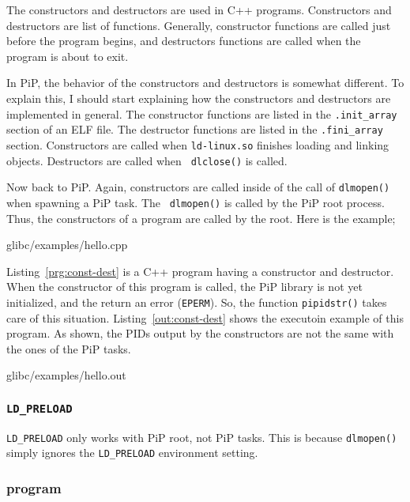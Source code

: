 The constructors and destructors are used in C++
programs. Constructors and destructors are list of
functions. Generally, constructor functions are called just before the 
program begins, and destructors functions are called when the program
is about to exit.

In PiP, the behavior of the constructors and destructors is
somewhat different. To explain this, I should start explaining how the
constructors and destructors are implemented in general. The
constructor functions are listed in the {\tt .init_array} section of an ELF
file. The destructor functions are listed in the {\tt .fini_array}
section. Constructors are called when {\tt ld-linux.so} finishes
loading and linking objects. Destructors are called when {\tt
  dlclose()} is called.

Now back to PiP. Again, constructors are called inside
of the call of {\tt dlmopen()} when spawning a PiP task. The {\tt
  dlmopen()} is called by the PiP root process. Thus, the constructors
of a program are called by the root. Here is the example;

 {glibc/examples/hello.cpp}

Listing~\ref{prg:const-dest} is a C++ program having a constructor and
destructor. When the constructor of this program is called, the PiP
library is not yet initialized, and the 
return an error ({\tt EPERM}). So, the function {\tt pipidstr()} takes
care of this situation. Listing~\ref{out:const-dest} shows the
executoin example of this program. As shown, the PIDs output by the
constructors are not the same with the ones of the PiP tasks. 

 {glibc/examples/hello.out}

\subsubsection{{\tt LD_PRELOAD}}

{\tt LD_PRELOAD} only works with PiP root, not PiP tasks. This is
because {\tt dlmopen()} simply ignores the {\tt LD_PRELOAD}
environment setting. 

\subsubsection{ program}


